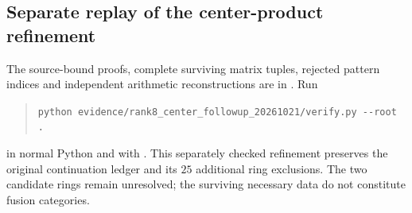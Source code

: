 \subsection{Separate replay of the center-product refinement}
The source-bound proofs, complete surviving matrix tuples, rejected pattern
indices and independent arithmetic reconstructions are in
. Run
\begin{quote}\small
\verb|python evidence/rank8_center_followup_20261021/verify.py --root .|
\end{quote}
in normal Python and with . This separately checked refinement
preserves the original continuation ledger and its $25$ additional ring
exclusions. The two candidate rings remain unresolved; the surviving
necessary data do not constitute fusion categories.
